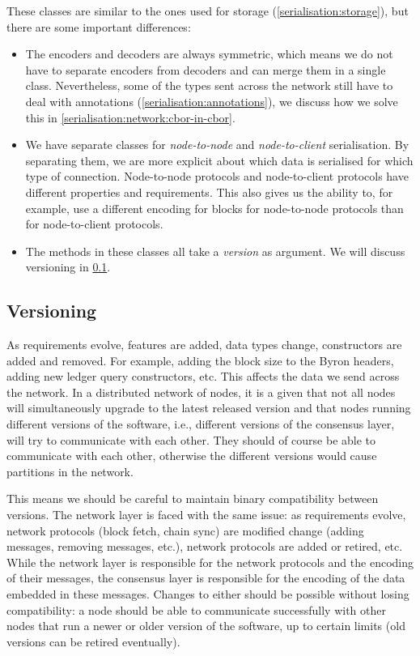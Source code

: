 These classes are similar to the ones used for storage
(\cref{serialisation:storage}), but there are some important differences:

\begin{itemize}
\item The encoders and decoders are always symmetric, which means we do not have
  to separate encoders from decoders and can merge them in a single class.
  Nevertheless, some of the types sent across the network still have to deal
  with annotations (\cref{serialisation:annotations}), we discuss how we solve
  this in \cref{serialisation:network:cbor-in-cbor}.
\item We have separate classes for \emph{node-to-node} and \emph{node-to-client}
  serialisation.
  By separating them, we are more explicit about which data is serialised for
  which type of connection. Node-to-node protocols and node-to-client protocols
  have different properties and requirements. This also gives us the ability to,
  for example, use a different encoding for blocks for node-to-node protocols
  than for node-to-client protocols.
\item The methods in these classes all take a \emph{version} as argument. We
  will discuss versioning in \cref{serialisation:network:versioning}.
\end{itemize}

\subsection{Versioning}
\label{serialisation:network:versioning}

As requirements evolve, features are added, data types change, constructors are
added and removed. For example, adding the block size to the Byron headers,
adding new ledger query constructors, etc. This affects the data we send across
the network. In a distributed network of nodes, it is a given that not all nodes
will simultaneously upgrade to the latest released version and that nodes
running different versions of the software, i.e., different versions of the
consensus layer, will try to communicate with each other. They should of course
be able to communicate with each other, otherwise the different versions would
cause partitions in the network.

This means we should be careful to maintain binary compatibility between
versions. The network layer is faced with the same issue: as requirements
evolve, network protocols (block fetch, chain sync) are modified
change (adding messages, removing messages, etc.), network protocols are added
or retired, etc. While the network layer is responsible for the network
protocols and the encoding of their messages, the consensus layer is responsible
for the encoding of the data embedded in these messages. Changes to either
should be possible without losing compatibility: a node should be able to
communicate successfully with other nodes that run a newer or older version of
the software, up to certain limits (old versions can be retired eventually).

